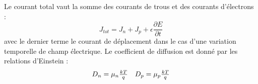 Le courant total vaut la somme des courants de trous et des courants d'électrons :
\begin{equation}
J_{tot}=J_n+J_p+\epsilon \frac{\partial E}{\partial t }
\end{equation}
avec le dernier terme le courant de déplacement dans le cas d'une variation temporelle de champ électrique. 
Le coefficient de diffusion est donné par les relations d'Einstein :
\begin{equation}
\begin{array}{c c}
D_n = \mu_n \frac{kT}{q} & D_p=\mu_p \frac{kT}{q}
\end{array}
\end{equation}

